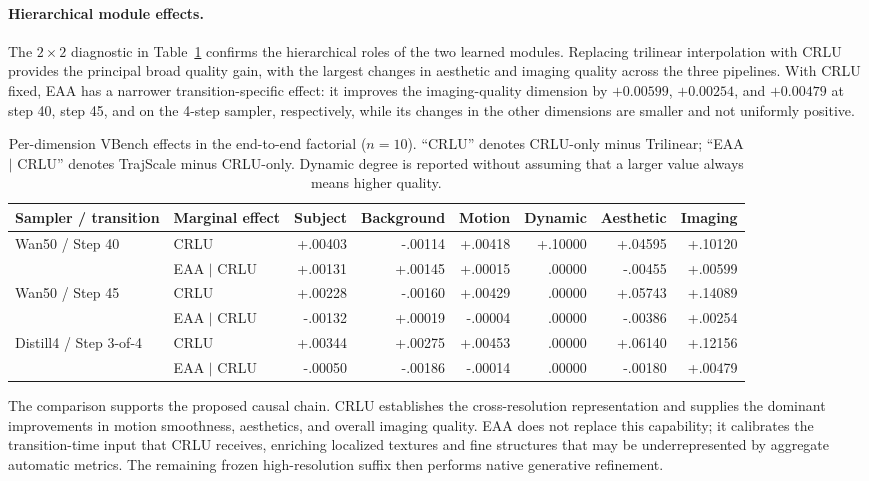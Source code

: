 \paragraph{Hierarchical module effects.}
The \(2\times2\) diagnostic in Table~\ref{tab:factorial} confirms the
hierarchical roles of the two learned modules. Replacing trilinear interpolation
with CRLU provides the principal broad quality gain, with the largest changes
in aesthetic and imaging quality across the three pipelines. With CRLU fixed,
EAA has a narrower transition-specific effect: it improves the imaging-quality
dimension by \(+0.00599\), \(+0.00254\), and \(+0.00479\) at step 40, step 45,
and on the 4-step sampler, respectively, while its changes in the other
dimensions are smaller and not uniformly positive.

\begin{table}[!t]
\centering
\footnotesize
\setlength{\tabcolsep}{3.1pt}
\begin{tabular}{llrrrrrr}
\toprule
Sampler / transition & Marginal effect & Subject & Background & Motion &
Dynamic & Aesthetic & Imaging \\
\midrule
Wan50 / Step 40 & CRLU & +.00403 & -.00114 & +.00418 & +.10000 & +.04595 & +.10120 \\
 & EAA $\mid$ CRLU & +.00131 & +.00145 & +.00015 & .00000 & -.00455 & +.00599 \\
Wan50 / Step 45 & CRLU & +.00228 & -.00160 & +.00429 & .00000 & +.05743 & +.14089 \\
 & EAA $\mid$ CRLU & -.00132 & +.00019 & -.00004 & .00000 & -.00386 & +.00254 \\
Distill4 / Step 3-of-4 & CRLU & +.00344 & +.00275 & +.00453 & .00000 & +.06140 & +.12156 \\
 & EAA $\mid$ CRLU & -.00050 & -.00186 & -.00014 & .00000 & -.00180 & +.00479 \\
\bottomrule
\end{tabular}
\caption{Per-dimension VBench effects in the end-to-end factorial
(\(n=10\)). ``CRLU'' denotes CRLU-only minus Trilinear; ``EAA \(\mid\) CRLU''
denotes TrajScale minus CRLU-only. Dynamic degree is reported without assuming
that a larger value always means higher quality.}
\label{tab:factorial}
\end{table}

The comparison supports the proposed causal chain. CRLU establishes the
cross-resolution representation and supplies the dominant improvements in
motion smoothness, aesthetics, and overall imaging quality. EAA does not replace
this capability; it calibrates the transition-time input that CRLU receives,
enriching localized textures and fine structures that may be underrepresented
by aggregate automatic metrics. The remaining frozen high-resolution suffix
then performs native generative refinement.


